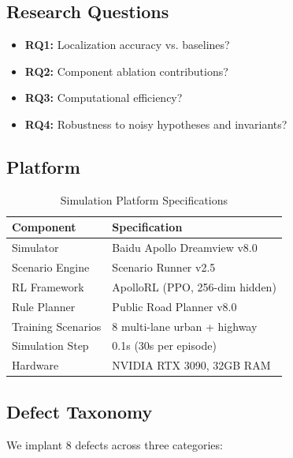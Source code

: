 \documentclass[conference]{IEEEtran}
\theoremstyle{plain}
\begin{document}
\subsection{Research Questions}
\begin{itemize}[nosep]
    \item \textbf{RQ1:} Localization accuracy vs. baselines?
    \item \textbf{RQ2:} Component ablation contributions?
    \item \textbf{RQ3:} Computational efficiency?
    \item \textbf{RQ4:} Robustness to noisy hypotheses and invariants?
\end{itemize}

\subsection{Platform}
\begin{table}[h]
\centering
\caption{Simulation Platform Specifications}
\label{tab:platform}
\begin{tabular}{ll}
\toprule
\textbf{Component} & \textbf{Specification}\\\midrule
Simulator & Baidu Apollo Dreamview v8.0 \\
Scenario Engine & Scenario Runner v2.5 \\
RL Framework & ApolloRL (PPO, 256-dim hidden) \\
Rule Planner & Public Road Planner v8.0 \\
Training Scenarios & 8 multi-lane urban + highway \\
Simulation Step & 0.1s (30s per episode) \\
Hardware & NVIDIA RTX 3090, 32GB RAM\\
\bottomrule
\end{tabular}
\end{table}

\subsection{Defect Taxonomy}
We implant 8 defects across three categories:
\end{document}
